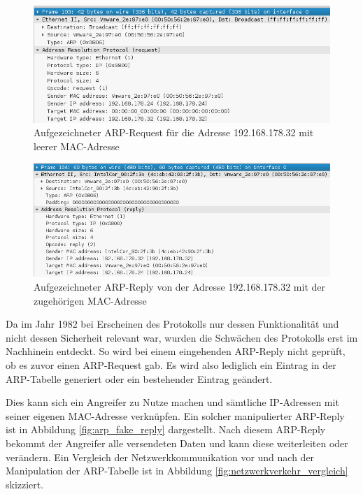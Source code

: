 \begin{figure}
	\centering
	\includegraphics[width=\textwidth]{images/arp/ARP_Request}
	\caption{Aufgezeichneter ARP-Request für die Adresse 192.168.178.32 mit leerer MAC-Adresse}
	\label{fig:arp_request}
\end{figure}

\begin{figure}
	\centering
	\includegraphics[width=\textwidth]{images/arp/ARP_Reply}
	\caption{Aufgezeichneter ARP-Reply von der Adresse 192.168.178.32 mit der zugehörigen MAC-Adresse}
	\label{fig:arp_reply}
\end{figure}

Da im Jahr 1982 bei Erscheinen des Protokolls nur dessen Funktionalität und nicht dessen Sicherheit relevant war, wurden die Schwächen des Protokolls erst im Nachhinein entdeckt. So wird bei einem eingehenden ARP-Reply nicht geprüft, ob es zuvor einen ARP-Request gab. Es wird also lediglich ein Eintrag in der ARP-Tabelle generiert oder ein bestehender Eintrag geändert.

Dies kann sich ein Angreifer zu Nutze machen und sämtliche IP-Adressen mit seiner eigenen MAC-Adresse verknüpfen. Ein solcher manipulierter ARP-Reply ist in Abbildung \ref{fig:arp_fake_reply} dargestellt. Nach diesem ARP-Reply bekommt der Angreifer alle versendeten Daten und kann diese weiterleiten oder verändern. Ein Vergleich der Netzwerkkommunikation vor und nach der Manipulation der ARP-Tabelle ist in Abbildung \ref{fig:netzwerkverkehr_vergleich} skizziert.

